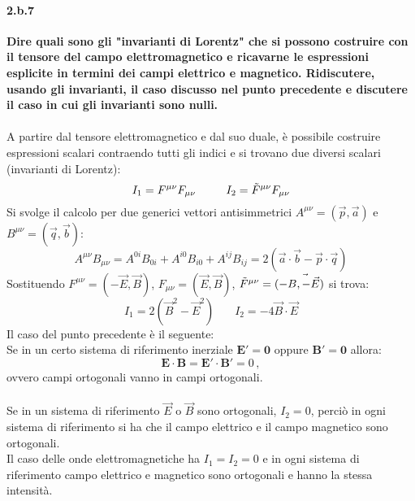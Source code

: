\documentclass[twoside]{article}
\begin{document}
\paragraph{2.b.7}\textbf{Dire quali sono gli "invarianti di Lorentz" che si possono costruire con il tensore
del campo elettromagnetico e ricavarne le espressioni esplicite in termini dei
campi elettrico e magnetico. Ridiscutere, usando gli invarianti, il caso discusso
nel punto precedente e discutere il caso in cui gli invarianti sono nulli.}\\ \\
A partire dal tensore elettromagnetico e dal suo duale, è possibile costruire espressioni scalari contraendo tutti gli indici e si trovano due diversi scalari (invarianti di Lorentz):
\begin{equation*}
    I_1=F^{\mu \nu}F_{\mu \nu} \ \ \ \ \ \ \ \ I_2=\Tilde{F}^{\mu \nu}F_{\mu \nu}
\end{equation*}
Si svolge il calcolo per due generici vettori antisimmetrici $A^{\mu \nu}=(\vec{p},\vec{a})$ e $B^{\mu \nu}=(\vec{q},\vec{b})$:
\begin{equation}
    A^{\mu \nu}B_{\mu \nu}=A^{0i}B_{0i}+A^{i0}B_{i0}+A^{ij}B_{ij}=2(\vec{a}\cdot\vec{b}-\vec{p}\cdot\vec{q})
\end{equation}
Sostituendo $F^{\mu \nu}=(-\vec{E},\vec{B})$, $F_{\mu \nu}=(\vec{E},\vec{B})$, $\Tilde{F}^{\mu \nu}=(-\vec{B,-\vec{E}})$ si trova:
\begin{equation}
    I_1=2(\vec{B}^2-\vec{E}^2) \ \ \ \ \ \ \ \ I_2=-4\vec{B}\cdot \vec{E}
\end{equation}
Il caso del punto precedente è il seguente: \\
Se in un certo sistema di riferimento inerziale $\mathbf{E'}=\mathbf{0}$ oppure $\mathbf{B'}=\mathbf{0}$ allora:
\begin{equation*}
\mathbf{E}\cdot\mathbf{B}=\mathbf{E'}\cdot\mathbf{B'}=0 \, ,
\end{equation*}
ovvero campi ortogonali vanno in campi ortogonali.
\\ \\
Se in un sistema di riferimento $\vec{E}$ o $\vec{B}$ sono ortogonali, $I_2=0$, perciò in ogni sistema di riferimento si ha che il campo elettrico e il campo magnetico sono ortogonali.
\\
Il caso delle onde elettromagnetiche ha $I_1=I_2=0$ e in ogni sistema di riferimento campo elettrico e magnetico sono ortogonali e hanno la stessa intensità.
\end{document}

